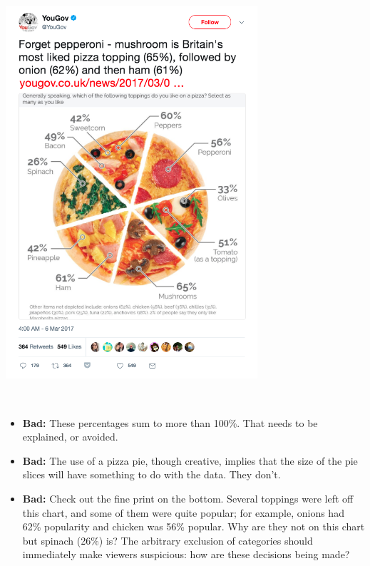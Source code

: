 \documentclass[
]{book}
\providecommand{\tightlist}{%
  \setlength{\itemsep}{0pt}\setlength{\parskip}{0pt}}
\begin{document}
~\\

\includegraphics[width=0.7\textwidth,height=\textheight]{img/vis9.png}

~

\begin{itemize}
\tightlist
\item
  \textbf{Bad:} These percentages sum to more than 100\%. That needs to be explained, or avoided.\\
\item
  \textbf{Bad:} The use of a pizza pie, though creative, implies that the size of the pie slices will have something to do with the data. They don't.
\item
  \textbf{Bad:} Check out the fine print on the bottom. Several toppings were left off this chart, and some of them were quite popular; for example, onions had 62\% popularity and chicken was 56\% popular. Why are they not on this chart but spinach (26\%) is? The arbitrary exclusion of categories should immediately make viewers suspicious: how are these decisions being made?
\end{itemize}

~\\
\end{document}
